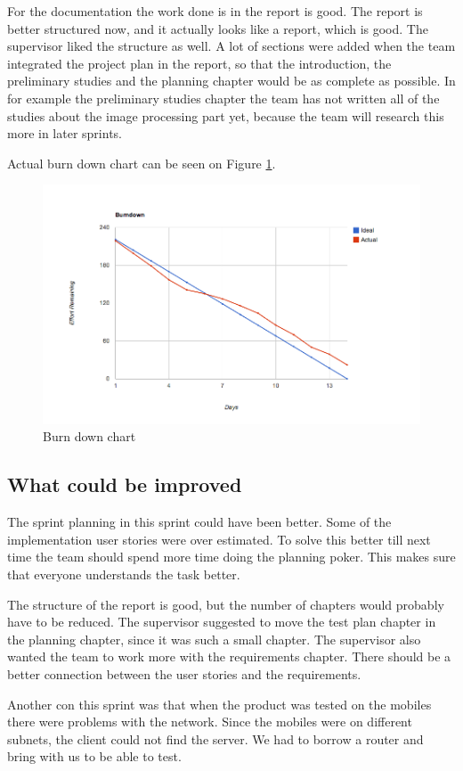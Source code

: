 For the documentation the work done is in the report is good. The report is better structured now, and it actually looks like a report, which is good. The supervisor liked the structure as well. A lot of sections were added when the team integrated the project plan in the report, so that the introduction, the preliminary studies and the planning chapter would be as complete as possible. In for example the preliminary studies chapter the team has not written all of the studies about the image processing part yet, because the team will research this more in later sprints.

Actual burn down chart can be seen on Figure \ref{fig:Burn1}.  

\begin{figure}[H]
	\centering
		\includegraphics[width=18cm]{sprint1/BurndownSprint1.png}
	\caption{Burn down chart}
	\label{fig:Burn1}
\end{figure}


\subsection{What could be improved}
The sprint planning in this sprint could have been better. Some of the implementation user stories were over estimated. To solve this better till next time the team should spend more time doing the planning poker. This makes sure that everyone understands the task better. 

The structure of the report is good, but the number of chapters would probably have to be reduced. The supervisor suggested to move the test plan chapter in the planning chapter, since it was such a small chapter. The supervisor also wanted the team to work more with the requirements chapter. There should be a better connection between the user stories and the requirements.


Another con this sprint was that when the product was tested on the mobiles there were problems with the network. Since the mobiles were on different subnets, the client could not find the server. We had to borrow a router and bring with us to be able to test. 


